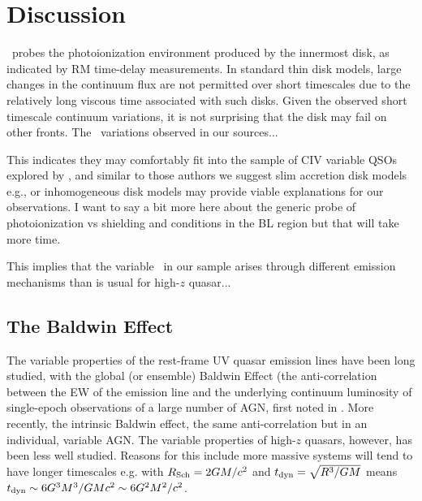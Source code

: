 \documentclass[a4paper,fleqn,usenatbib]{mnras}
\begin{document}
\section{Discussion}
\civ\ probes the photoionization environment produced by the innermost
disk, as indicated by RM time-delay measurements. In standard \citet{SS73}
thin disk models, large changes in the continuum flux are not
permitted over short timescales due to the relatively long viscous
time associated with such disks. Given the observed short timescale
continuum variations, it is not surprising that the \citet{SS73} disk may fail
on other fronts. The \civ\ variations observed in our sources... 

This indicates they may comfortably fit into the sample of CIV
variable QSOs explored by \citet{Dyer2019}, and similar to those
authors we suggest slim accretion disk models e.g., 
\citet[][]{Abramowicz1988} or inhomogeneous disk models
\citep[e.g.,][]{DexterAgol2011} may provide viable explanations for
our observations. I want to say a bit more here about the generic
probe of photoionization vs shielding and conditions in the BL region
but that will take more time.

This implies that the variable \civ\ in our sample arises through
different emission mechanisms than is usual for high-$z$ quasar...

\subsection{The Baldwin Effect}
The variable properties of the rest-frame UV quasar emission lines
have been long studied, with the global (or ensemble) Baldwin Effect
(the anti-correlation between the EW of the emission line and the
underlying continuum luminosity of single-epoch observations of a
large number of AGN, first noted in \citet{Baldwin1977}.  More
recently, the intrinsic Baldwin effect, the same anti-correlation but
in an individual, variable AGN.  The variable properties of high-$z$
quasars, however, has been less well studied. Reasons for this include
more massive systems will tend to have longer timescales e.g. with
$R_{\rm Sch}= 2GM /c^{2}$ and $t_{\rm dyn} =\sqrt{ R^{3}/GM}$ means
$t_{\rm dyn} \sim 6 G^{3} M^{3} / GM c^{2} \sim 6G^{2} M^{2} / c^{2}
$.
\end{document}
